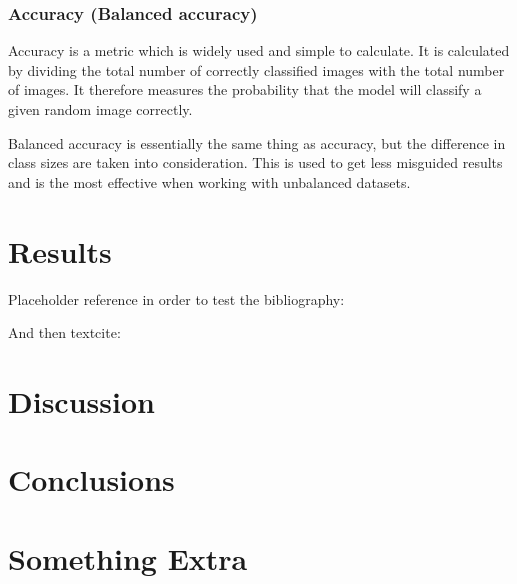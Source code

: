 \documentclass{kththesis}
\begin{document}
\subsection{Accuracy (Balanced accuracy)}

Accuracy is a metric which is widely used and simple to calculate.  It is calculated by dividing the total number of correctly classified images with the total number of images. It therefore measures the probability that the model will classify a given random image correctly. %

Balanced accuracy is essentially the same thing as accuracy, but the difference in class sizes are taken into consideration. This is used to get less misguided results and is the most effective when working with unbalanced datasets.



\chapter{Results}
Placeholder reference in order to test the bibliography: \parencite{einstein2016}

And then textcite: \textcite{einstein2016}
\blindtext

\chapter{Discussion}
\blindtext

\chapter{Conclusions}
\blindtext

\printbibliography[heading=bibintoc]

\appendix

\chapter{Something Extra}

\tailmatter
\end{document}
